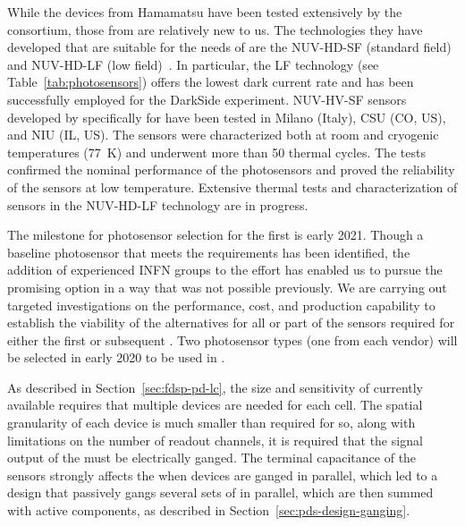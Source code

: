 While the devices from Hamamatsu have been tested extensively by the consortium, those from  are relatively new to us. The technologies they have developed that are suitable for the needs of  are the NUV-HD-SF (standard field) and NUV-HD-LF (low field)~\cite{Gola:2019idb}. In particular, the LF technology (see Table~\ref{tab:photosensors}) offers the lowest dark current rate and has been successfully employed for the DarkSide experiment. NUV-HV-SF sensors developed by  specifically for  have been tested in Milano (Italy), CSU (CO, US), and NIU (IL, US). The sensors were characterized both at room and cryogenic temperatures (\SI{77}{K}) and underwent more than \num{50} thermal cycles. The tests confirmed the nominal performance of the photosensors and proved the reliability of the sensors at low temperature. Extensive thermal tests and characterization of sensors in the NUV-HD-LF technology are in progress.   

The milestone for photosensor selection for the first  is early 2021.  Though a baseline photosensor that meets the requirements has been identified, the addition of experienced INFN groups to the  effort has enabled us to pursue the promising  option in a way that was not possible previously.  We are carrying out targeted investigations on the performance, cost, and production capability to establish the viability of the alternatives for all or part of the sensors required for either the first or subsequent . Two photosensor types (one from each vendor) will be selected in early 2020 to be used in .

As described in Section~\ref{sec:fdsp-pd-lc}, the size and sensitivity of currently available  requires that multiple devices are needed for each  cell. The spatial granularity of each device is much smaller than required for  so,
along with limitations on the number of readout channels, it is required that the signal output of the  must be electrically ganged. The terminal capacitance of the sensors strongly affects the  when devices are ganged in parallel, which led to a design that passively gangs several sets of  in parallel, which are then summed with active components, as described in Section~\ref{sec:pds-design-ganging}.


